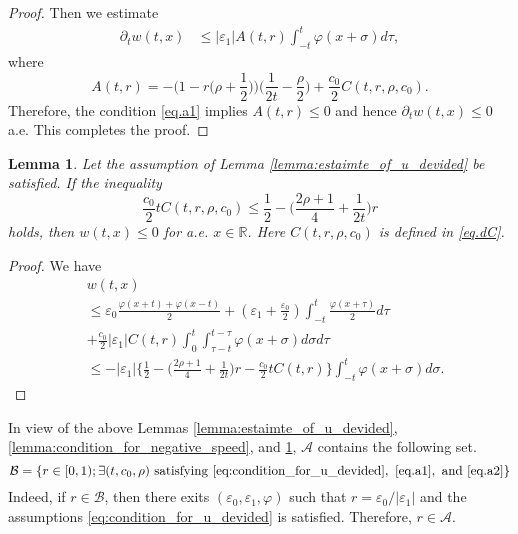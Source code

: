 \documentclass[reqno]{amsart}
\newtheorem{Lemma}[Theorem]{Lemma}
\begin{document}
\begin{proof}
Then we estimate
	\begin{align}
	\label{HH2}
	\partial_t w(t,x)
	&\leq |\varepsilon_1| A(t,r) \int_{-t}^t  \varphi(x+\sigma) d\tau,
	\end{align}
where 
	\[
	A(t,r) =
	- \bigg(1 - r \bigg( \rho + \frac{1}{2} \bigg) \bigg) \bigg( \frac{1}{2t} - \frac \rho 2 \bigg)
	+ \frac{c_0}{2} C(t,r, \rho,c_0).
	\]
Therefore, the condition \eqref{eq.a1} implies $A(t,r) \leq 0$
and hence $\partial_t w(t,x) \leq 0$ a.e.
This completes the proof.
\end{proof}


\begin{Lemma}
\label{lemma:condition_for_negative_position}
Let the assumption of Lemma \ref{lemma:estaimte_of_u_devided}
be satisfied.
If the inequality
	\begin{equation}\label{eq.a2}
   \frac{c_0}{2}t  C(t,r,\rho,c_0)
	\leq \frac 1 2 - \bigg( \frac{2\rho+1}{4} + \frac{1}{2t}\bigg) r
	\end{equation}
holds, then
$ w (t,x) \leq 0$ for a.e. $x \in \mathbb{R}$.
Here $C(t,r,\rho,c_0)$ is defined in \eqref{eq.dC}.
\end{Lemma}
 \begin{proof}
     We have
     \begin{align*}
	&w(t,x)\\
	&\leq \varepsilon_0 \frac{\varphi(x+t)+ \varphi(x-t)}{2} 
	+ \left(\varepsilon_1 + \frac{\varepsilon_0}{2} \right) \int_{-t}^{t}\frac{\varphi(x+\tau)}{2} d\tau \\
	& + \frac{c_0}{2}|\varepsilon_1| C(t,r) \int_0^t \int_{\tau-t}^{t-\tau}\varphi(x+\sigma) d\sigma d\tau\\
	&\leq
	- |\varepsilon_1|
	\bigg\{
		\frac 1 2
		- \bigg( \frac{2\rho+1}{4} + \frac{1}{2t}\bigg) r
		- \frac{c_0}{2} t  C(t,r)
	\bigg\}
	\int_{-t}^t \varphi(x+\sigma) d\sigma.
	\end{align*}
 \end{proof}

In view of the above Lemmas
\ref{lemma:estaimte_of_u_devided},
\ref{lemma:condition_for_negative_speed},
and \ref{lemma:condition_for_negative_position},
$\mathcal{A}$ contains the following set.
	\[
	\mathcal{B}
	= \{r \in [0,1); \exists (t,c_0,\rho)\
	\mathrm{satisfying}\
	\eqref{eq:condition_for_u_devided},\
	\eqref{eq.a1},\
	\mathrm{and}\ \eqref{eq.a2}\}
	\]
Indeed, if $r \in \mathcal{B}$, then
there exits $(\varepsilon_0, \varepsilon_1, \varphi)$
such that $r=\varepsilon_0/|\varepsilon_1|$ and the assumptions
\eqref{eq:condition_for_u_devided} is satisfied.
Therefore, $r \in \mathcal{A}$.
\end{document}
